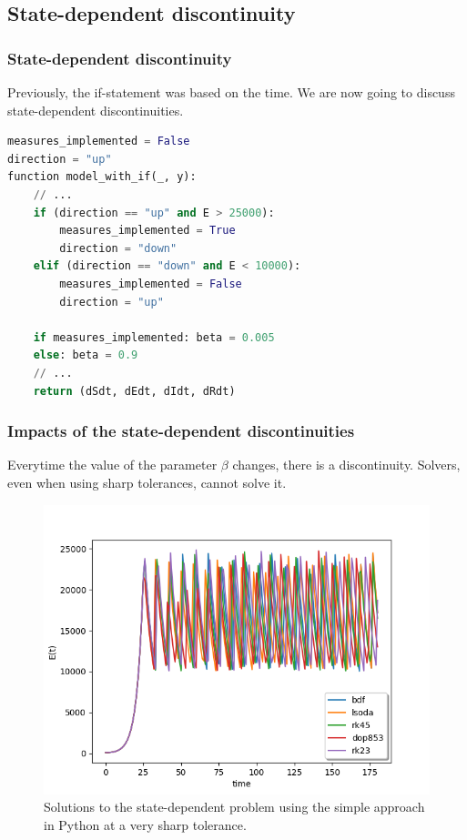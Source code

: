 \documentclass{beamer}
\begin{document}
\subsection{State-dependent discontinuity}
\begin{frame}[fragile]
\frametitle{State-dependent discontinuity}
Previously, the if-statement was based on the time.
We are now going to discuss state-dependent discontinuities.
\begin{lstlisting}[language=Python]
measures_implemented = False
direction = "up"
function model_with_if(_, y):
    // ...
    if (direction == "up" and E > 25000):
        measures_implemented = True
        direction = "down"
    elif (direction == "down" and E < 10000):
        measures_implemented = False
        direction = "up"

    if measures_implemented: beta = 0.005 
    else: beta = 0.9
    // ...
    return (dSdt, dEdt, dIdt, dRdt)
\end{lstlisting}
\end{frame}

\begin{frame}
\frametitle{Impacts of the state-dependent discontinuities}
Everytime the value of the parameter $\beta$ changes, there is a discontinuity.
Solvers, even when using sharp tolerances, cannot solve it.
\begin{figure}[H]
\centering
\includegraphics[width=0.7\linewidth]{./figures/state_discontinuity_sharp_py}
\caption{Solutions to the state-dependent problem using the simple approach in Python at a very sharp tolerance.}
\label{fig:state_discontinuity_sharp_py}
\end{figure}
\end{frame}
\end{document}
